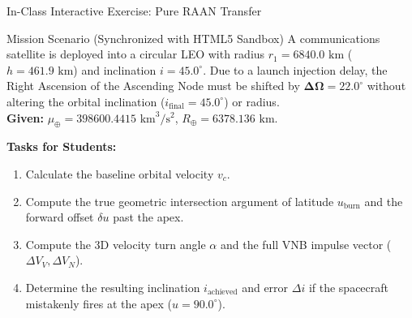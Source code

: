 \documentclass[aspectratio=169,10pt]{beamer}
\begin{document}
\begin{frame}{In-Class Interactive Exercise: Pure RAAN Transfer}
    \begin{exampleblock}{Mission Scenario (Synchronized with HTML5 Sandbox)}
        \footnotesize
        A communications satellite is deployed into a circular LEO with radius $r_1 = 6840.0\text{ km}$ ($h = 461.9\text{ km}$) and inclination $i = 45.0^\circ$. Due to a launch injection delay, the Right Ascension of the Ascending Node must be shifted by $\mathbf{\Delta\Omega = 22.0^\circ}$ without altering the orbital inclination ($i_{\text{final}} = 45.0^\circ$) or radius. \\
        \textbf{Given:} $\mu_{\oplus} = 398600.4415\text{ km}^3/\text{s}^2$, $R_{\oplus} = 6378.136\text{ km}$.
    \end{exampleblock}

    \vspace{0.1cm}
    \footnotesize
    \textbf{Tasks for Students:}
    \begin{enumerate}\setlength{\itemsep}{2pt}
        \item Calculate the baseline orbital velocity $v_c$.
        \item Compute the true geometric intersection argument of latitude $u_{\text{burn}}$ and the forward offset $\delta u$ past the apex.
        \item Compute the 3D velocity turn angle $\alpha$ and the full VNB impulse vector ($\Delta V_V, \Delta V_N$).
        \item Determine the resulting inclination $i_{\text{achieved}}$ and error $\Delta i$ if the spacecraft mistakenly fires at the apex ($u = 90.0^\circ$).
    \end{enumerate}
\end{frame}
\end{document}

